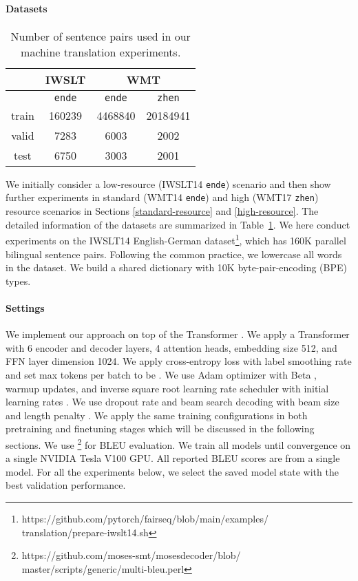 \documentclass[11pt]{article}
\begin{document}
\paragraph{Datasets}

\begin{table}[h]
\centering
\begin{tabular}{c|c|c|c} 
 & IWSLT & \multicolumn{2}{|c}{WMT} \\
\hline
\hline
& \texttt{en}\texttt{de} & \texttt{en}\texttt{de} & \texttt{zh}\texttt{en} \\
\hline
train & 160239 & 4468840 & 20184941 \\ 
valid & 7283 & 6003 & 2002 \\ 
test & 6750 & 3003 & 2001 \\ 
\hline
\end{tabular}
\caption{Number of sentence pairs used in our machine translation experiments.}
\label{statics}
\end{table}

We initially consider a low-resource (IWSLT14 \texttt{en}\texttt{de}) scenario and then show further experiments in standard (WMT14 \texttt{en}\texttt{de}) and high (WMT17 \texttt{zh}\texttt{en}) resource scenarios in Sections \ref{standard-resource} and \ref{high-resource}. The detailed information of the datasets are summarized in Table~\ref{statics}. We here conduct experiments on the IWSLT14 English-German dataset\footnote{https://github.com/pytorch/fairseq/blob/main/examples/ translation/prepare-iwslt14.sh}, which has 160K parallel bilingual sentence pairs. Following the common practice, we lowercase all words in the dataset. We build a shared dictionary with 10K byte-pair-encoding (BPE) \cite{sennrich2015neural} types.

\paragraph{Settings}

We implement our approach on top of the Transformer \cite{vaswani2017attention}. We apply a Transformer with 6 encoder and decoder layers, 4 attention heads, embedding size 512, and FFN layer dimension 1024. We apply cross-entropy loss with label smoothing rate  and set max tokens per batch to be . 
We use Adam optimizer with Beta ,  warmup updates, and inverse square root learning rate scheduler with initial learning rates . We use dropout rate  and beam search decoding with beam size  and length penalty . We apply the same training configurations in both pretraining and finetuning stages which will be discussed in the following sections. We use \footnote{https://github.com/moses-smt/mosesdecoder/blob/ master/scripts/generic/multi-bleu.perl} for BLEU \cite{papineni2002bleu} evaluation. We train all models until convergence on a single NVIDIA Tesla V100 GPU. All reported BLEU scores are from a single model. For all the experiments below, we select the saved model state with the best validation performance.
\end{document}
